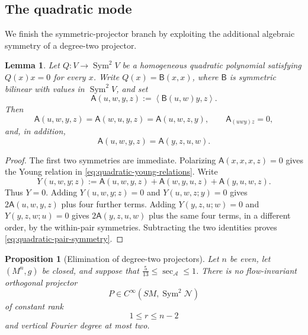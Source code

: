 \documentclass[reqno,11pt]{amsart}
\newtheorem{proposition}[theorem]{Proposition}
\newtheorem{lemma}[theorem]{Lemma}
\theoremstyle{definition}
\newcommand{\SM}{SM}
\newcommand{\cN}{\mathcal N}
\newcommand{\cA}{\mathcal A}
\newcommand{\Sym}{\operatorname{Sym}}
\newcommand{\inner}[2]{\left\langle #1,#2\right\rangle}
\begin{document}
\subsection{The quadratic mode}

We finish the symmetric-projector branch by exploiting the additional
algebraic symmetry of a degree-two projector.

\begin{lemma}
\label{lem:quadratic-young}
Let $Q:V\to\Sym^2V$ be a homogeneous quadratic polynomial satisfying
$Q(x)x=0$ for every $x$. Write $Q(x)=\mathsf B(x,x)$, where
$\mathsf B$ is symmetric bilinear with values in $\Sym^2V$, and set
$$
 \mathsf A(u,w,y,z):=\inner{\mathsf B(u,w)y}{z}.
$$
Then
\begin{equation}\label{eq:quadratic-young-relations}
 \mathsf A(u,w,y,z)=\mathsf A(w,u,y,z)
 =\mathsf A(u,w,z,y),
 \qquad
 \mathsf A_{(uwy)z}=0,
\end{equation}
and, in addition,
\begin{equation}\label{eq:quadratic-pair-symmetry}
 \mathsf A(u,w,y,z)=\mathsf A(y,z,u,w).
\end{equation}
\end{lemma}

\begin{proof}
The first two symmetries are immediate. Polarizing
$\mathsf A(x,x,x,z)=0$ gives the Young relation in
\eqref{eq:quadratic-young-relations}.  Write
$$
 Y(u,w,y;z):=\mathsf A(u,w,y,z)+\mathsf A(w,y,u,z)
              +\mathsf A(y,u,w,z).
$$
Thus $Y=0$.  Adding $Y(u,w,y;z)=0$ and $Y(u,w,z;y)=0$ gives
$2\mathsf A(u,w,y,z)$ plus four further terms.  Adding
$Y(y,z,u;w)=0$ and $Y(y,z,w;u)=0$ gives
$2\mathsf A(y,z,u,w)$ plus the same four terms, in a different order, by
the within-pair symmetries.  Subtracting the two identities proves
\eqref{eq:quadratic-pair-symmetry}.
\end{proof}

\begin{proposition}[Elimination of degree-two projectors]
\label{prop:quadratic-projector}
Let $n$ be even, let $(M^n,g)$ be closed, and suppose that
$\frac5{13}\leq\sec_{\cA}\leq1$. There is no flow-invariant orthogonal
projector
$$
 P\in C^\infty(\SM,\Sym^2\cN)
$$
of constant rank
$$
  1\leq r\leq n-2
$$
and vertical Fourier degree at most two.
\end{proposition}
\end{document}

